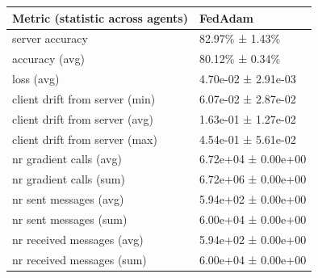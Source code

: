 \begin{tabular}{ll}
\hline
 Metric (statistic across agents)   & FedAdam             \\
\hline
 server accuracy                    & 82.97\% ± 1.43\%      \\
 accuracy (avg)                     & 80.12\% ± 0.34\%      \\
 loss (avg)                         & 4.70e-02 ± 2.91e-03 \\
 client drift from server (min)     & 6.07e-02 ± 2.87e-02 \\
 client drift from server (avg)     & 1.63e-01 ± 1.27e-02 \\
 client drift from server (max)     & 4.54e-01 ± 5.61e-02 \\
 nr gradient calls (avg)            & 6.72e+04 ± 0.00e+00 \\
 nr gradient calls (sum)            & 6.72e+06 ± 0.00e+00 \\
 nr sent messages (avg)             & 5.94e+02 ± 0.00e+00 \\
 nr sent messages (sum)             & 6.00e+04 ± 0.00e+00 \\
 nr received messages (avg)         & 5.94e+02 ± 0.00e+00 \\
 nr received messages (sum)         & 6.00e+04 ± 0.00e+00 \\
\hline
\end{tabular}
